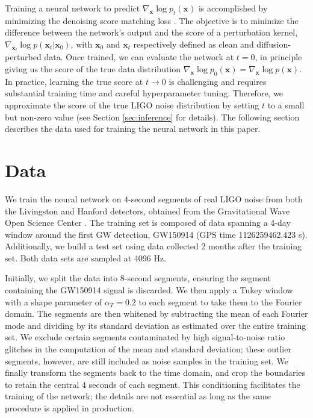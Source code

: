 \documentclass[twocolumn]{aastex631}
\begin{document}
Training a neural network to predict $\nabla_{\boldsymbol{x}} \log p_{t}(\boldsymbol{x})$ is accomplished by minimizing the denoising score matching loss \citep{Vincent2011, song2020sde}. The objective is to minimize the difference between the network's output and the score of a perturbation kernel, $\nabla_{\boldsymbol{x}_t} \log p(\boldsymbol{x}_t | \boldsymbol{x}_0)$, with $\boldsymbol{x}_0$ and $\boldsymbol{x}_t$ respectively defined as clean and diffusion-perturbed data. Once trained, we can evaluate the network at $t = 0$, in principle giving us the score of the true data distribution $\nabla_{\boldsymbol{x}} \log p_0(\boldsymbol{x}) = \nabla_{\boldsymbol{x}} \log p(\boldsymbol{x})$.
%
In practice, learning the true score at $t \to 0$ is challenging and requires substantial training time and careful hyperparameter tuning. Therefore, we approximate the score of the true LIGO noise distribution by setting $t$ to a small but non-zero value (see Section \ref{sec:inference} for details). The following section describes the data used for training the neural network in this paper.


\section{Data}
\label{sec:data}

We train the neural network on 4-second segments of real LIGO noise from both the Livingston and Hanford detectors, obtained from the Gravitational Wave Open Science Center \citep{LIGOScientific:2019lzm,gwosc:bulk}. The training set is composed of data spanning a 4-day window around the first GW detection, GW150914 (GPS time 1126259462.423 s). Additionally, we build a test set using data collected 2 months after the training set. Both data sets are sampled at 4096 Hz. 

Initially, we split the data into 8-second segments, ensuring the segment containing the GW150914 signal is discarded. We then apply a Tukey window with a shape parameter of \(\alpha_T = 0.2\) to each segment to take them to the Fourier domain. The segments are then whitened by subtracting the mean of each Fourier mode and dividing by its standard deviation as estimated over the entire training set. We exclude certain segments contaminated by high signal-to-noise ratio glitches in the computation of the mean and standard deviation; these outlier segments, however, are still included as noise samples in the training set. We finally transform the segments back to the time domain, and crop the boundaries to retain the central 4 seconds of each segment. This conditioning facilitates the training of the network; the details are not essential as long as the same procedure is applied in production.
\end{document}
